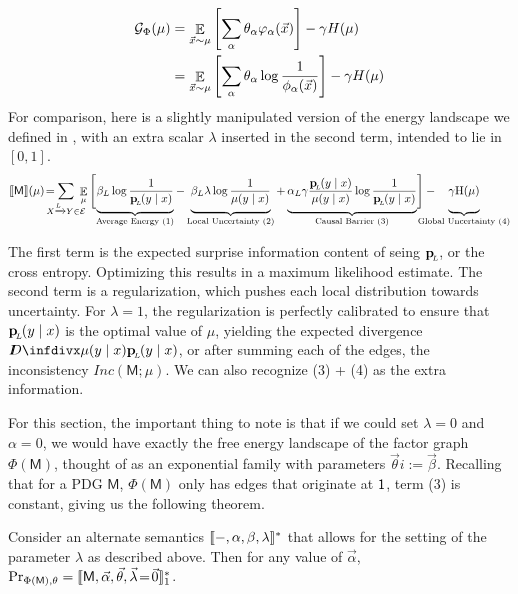 \documentclass{article}
\DeclarePairedDelimiter{\UD}{\llbracket}{\rrbracket^*}
\newcommand{\bp}[1][L]{\mat{p}_{\!_{#1}\!}}
\newcommand{\Ed}{\mathcal E}
\newcommand{\sfM}{\mathsf M}
\newcommand\inconsist{\mathit{Inc}}
\numberwithin{equation}{section}
\begin{document}
	\begin{align*}
		\mathcal G_\Phi(\mu) &=  \mathop{\mathbb E}_{\vec x \sim \mu} \left[\sum_\alpha \theta_\alpha \varphi_\alpha(\vec x) \right] - \gamma H(\mu) \\
			&= \mathop{\mathbb E}_{\vec x \sim \mu} \left[\sum_\alpha \theta_\alpha \log \frac{1}{\phi_\alpha(\vec x)} \right] - \gamma H(\mu)
	\end{align*}
	For comparison, here is a slightly manipulated version of the energy landscape we defined in , with an extra scalar $\lambda$ inserted in the second term, intended to lie in $[0,1]$.
	\begin{equation*}
		\bbr{\sfM}(\mu) \!=\mskip-18mu \sum_{ X \xrightarrow{\!\!L} Y  \in \Ed } \!\!\!\!\E_\mu  \Bigg[\!
			\underbrace{\beta_L \log \frac{1}{\bp(y\mid x)} \vphantom{\Bigg|}}_{\text{Average Energy (1)}}  - 
			\underbrace{\beta_L \lambda \log \frac{1}{\mu(y \mid x)}  \vphantom{\Bigg|}}_{\text{Local Uncertainty (2)}}  + 
			\underbrace{\alpha_L \gamma \frac{\bp(y \mid x)}{\mu(y \mid x)}\log \frac{1}{\bp(y\mid x)}  \vphantom{\Bigg|}}_{\text{Causal Barrier (3)}}\! \Bigg] - 
			\mskip-31mu\underbrace{\gamma \H(\mu) \vphantom{\Bigg|} }_{\text{Global Uncertainty (4)}}
	\end{equation*}

	The first term is the expected surprise information content of seing $\bp$, or the cross entropy. Optimizing this results in a maximum likelihood estimate. The second term is a regularization, which pushes each local distribution towards uncertainty. For $\lambda = 1$, the regularization is perfectly calibrated to ensure that $\bp(y \mid x)$ is the optimal value of $\mu$, yielding the expected divergence $\kldiv{\mu(y\mid x)}{\bp(y\mid x)}$, or after summing each of the edges, the inconsistency $\inconsist(\sfM ; \mu)$. We can also recognize (3) + (4) as the extra information.
	
	For this section, the important thing to note is that if we could set $\lambda = 0$ and $\alpha = 0$, we would have exactly the free energy landscape of the factor graph $\Phi(\sfM)$, thought of as an exponential family with parameters $\vec \theta i:= \vec \beta$. Recalling that for a PDG $\sfM$, $\Phi(\sfM)$ only has edges that originate at $\sf 1$, term (3) is constant, giving us the following theorem.
	
	\begin{theorem}
		Consider an alternate semantics $\UD{-, \alpha, \beta, \lambda}$ that allows for the setting of the parameter $\lambda$ as described above. Then for any value of $\vec\alpha$, $\Pr_{\Phi(\sfM),\theta} = \UD{\sfM, \vec{\alpha}, \vec{\theta}, \vec\lambda \!=\! \vec 0 }_1$.
	\end{theorem}
\end{document}
